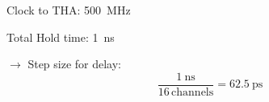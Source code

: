 Clock to THA: \SI{500}{\mega \hertz}

Total Hold time: \SI{1}{\nano \second}

$\rightarrow$ Step size for delay:
\begin{equation}
\frac{\SI{1}{\nano \second}}{16 \, \text{channels}} = \SI{62.5}{\pico \second}
\end{equation}

